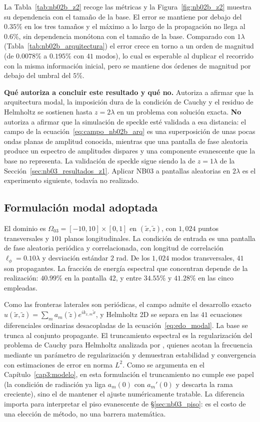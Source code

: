 La Tabla~\ref{tab:nb02b_z2} recoge las métricas y la
Figura~\ref{fig:nb02b_z2} muestra su dependencia con el tamaño de la base. El
error se mantiene por debajo del $0.35\%$ en los tres tamaños y el máximo a lo
largo de la propagación no llega al $0.6\%$, sin dependencia monótona con el
tamaño de la base. Comparado con
$1\lambda$ (Tabla~\ref{tab:nb02b_arquitectura}) el error crece en torno a un
orden de magnitud (de $0.0078\%$ a $0.195\%$ con $41$ modos), lo cual es
esperable al duplicar el recorrido con la misma información inicial, pero se
mantiene dos órdenes de magnitud por debajo del umbral del $5\%$.

\textbf{Qué autoriza a concluir este resultado y qué no.} Autoriza a afirmar
que la arquitectura modal, la imposición dura de la condición de Cauchy y el
residuo de Helmholtz se sostienen hasta $z=2\lambda$ en un problema con
solución exacta. \textbf{No} autoriza a afirmar que la simulación de speckle
esté validada a esa distancia: el campo de la
ecuación~\eqref{eq:campo_nb02b_arq} es una superposición de unas pocas ondas
planas de amplitud conocida, mientras que una pantalla de fase aleatoria
produce un espectro de amplitudes dispares y una componente evanescente que la
base no representa. La validación de speckle sigue siendo la de
$z=1\lambda$ de la Sección~\ref{sec:nb03_resultados_z1}. Aplicar NB03 a
pantallas aleatorias en $2\lambda$ es el experimento siguiente, todavía no
realizado.

\subsection{Formulación modal adoptada}
\label{sec:nb03_config}

El dominio es $\Omega_{03}=[-10,10]\times[0,1]$ en $(\tilde x,\tilde z)$, con
$1{,}024$ puntos transversales y $101$ planos longitudinales. La condición de
entrada es una pantalla de fase aleatoria periódica y correlacionada, con
longitud de correlación $\ell_\phi=0.10\lambda$ y desviación estándar $2$ rad.
De los $1{,}024$ modos transversales, $41$ son propagantes. La fracción de
energía espectral que concentran depende de la realización: $40.99\%$ en la
pantalla 42, y entre $34.55\%$ y $41.28\%$ en las cinco empleadas.

Como las fronteras laterales son periódicas, el campo admite el desarrollo
exacto $u(\tilde x,\tilde z)=\sum_m a_m(\tilde z)e^{i k_{x,m}\tilde x}$, y
Helmholtz 2D se separa en las $41$ ecuaciones diferenciales ordinarias
desacopladas de la ecuación~\eqref{eq:edo_modal}. La base se trunca al conjunto
propagante. El truncamiento espectral es la regularización del problema de
Cauchy para Helmholtz analizada por \textcite{nguyen2016truncation}, quienes
acotan la frecuencia mediante un parámetro de regularización y demuestran
estabilidad y convergencia con estimaciones de error en norma $L^2$. Como se
argumenta en el Capítulo~\ref{cap3:modelo}, en esta formulación el truncamiento
no cumple ese papel (la condición de radiación ya liga $a_m(0)$ con
$a_m'(0)$ y descarta la rama creciente), sino el de mantener el ajuste
numéricamente tratable. La diferencia importa para interpretar el piso
evanescente de §\ref{sec:nb03_piso}: es el costo de una elección de método, no
una barrera matemática.

